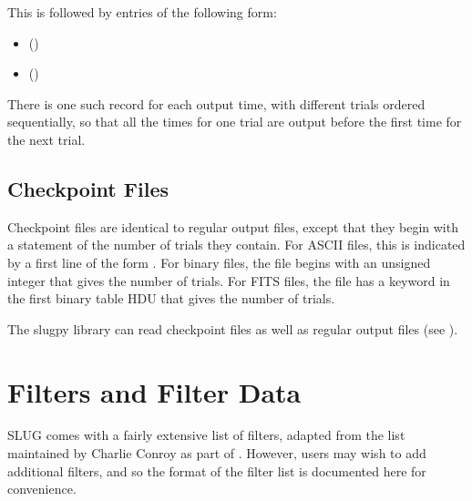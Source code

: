 \documentclass[letterpaper,10pt,english]{sphinxmanual}
\begin{document}
This is followed by  entries of the following form:
\begin{itemize}
\item {} 
 ()

\item {} 
 ()

\end{itemize}

There is one such record for each output time, with different trials
ordered sequentially, so that all the times for one trial are output
before the first time for the next trial.


\section{Checkpoint Files}
\label{\detokenize{output:checkpoint-files}}\label{\detokenize{output:ssec-checkpoint-files}}
Checkpoint files are identical to regular output files, except that
they begin with a statement of the number of trials they contain. For
ASCII files, this is indicated by a first line of the form . For binary files, the file begins with an unsigned integer that
gives the number of trials. For FITS files, the file has a keyword
 in the first binary table HDU that gives the number of
trials.

The slugpy library can read checkpoint files as well as regular output
files (see {\hyperref[\detokenize{slugpy:sec-slugpy}]{}}).


\chapter{Filters and Filter Data}
\label{\detokenize{filters:filters-and-filter-data}}\label{\detokenize{filters:sec-filters}}\label{\detokenize{filters::doc}}
SLUG comes with a fairly extensive list of filters, adapted from the list maintained by Charlie Conroy as part of . However, users may wish to add additional filters, and so the format of the filter list is documented here for convenience.
\end{document}
